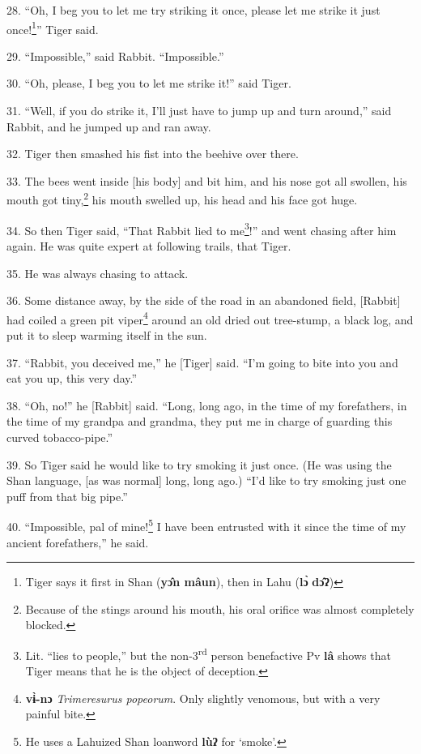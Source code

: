28. ``Oh, I beg you to let me try striking it once, please let me strike it just
once!\footnote{Tiger says it first in Shan (\textbf{yɔ̂n mâun}), then in Lahu (\textbf{lɔ̀} \textbf{dɔ̂ʔ})}'' Tiger said.

29. ``Impossible,'' said Rabbit. ``Impossible.''

30. ``Oh, please, I beg you to let me strike it!'' said Tiger.

31. ``Well, if you do strike it, I'll just have to jump up and turn around,'' said
Rabbit, and he jumped up and ran away.

32. Tiger then smashed his fist into the beehive over there.

33. The bees went inside [his body] and bit him, and his nose got all swollen,
his mouth got tiny,\footnote{Because of the stings around his mouth, his oral orifice was almost completely blocked.} his mouth swelled up, his head and his face got huge.

34. So then Tiger said, ``That Rabbit lied to me\footnote{Lit. ``lies to people,'' but the non-3\textsuperscript{rd} person benefactive Pv \textbf{lâ} shows that Tiger means that he is the object of deception.}!'' and went chasing after
him again. He was quite expert at following trails, that Tiger.

35. He was always chasing to attack.

36. Some distance away, by the side of the road in an abandoned field, [Rabbit]
had coiled a green pit viper\footnote{\textbf{vɨ̀-nɔ} \textit{Trimeresurus popeorum}. Only slightly venomous, but with a very painful bite.} around an old dried out tree-stump, a black log, and put it to sleep warming itself in the sun.

37. ``Rabbit, you deceived me,'' he [Tiger] said. ``I'm going to bite into you
and eat you up, this very day.''

38. ``Oh, no!'' he [Rabbit] said. ``Long, long ago, in the time of my forefathers,
in the time of my grandpa and grandma, they put me in charge of guarding this curved tobacco-pipe.''

39. So Tiger said he would like to try smoking it just once. (He was using
the Shan language, [as was normal] long, long ago.) ``I'd like to try smoking just one puff from that big pipe.''

40. ``Impossible, pal of mine!\footnote{He uses a Lahuized Shan loanword \textbf{lùʔ} for `smoke'.} I have been entrusted with it since the time
of my ancient forefathers,'' he said.

